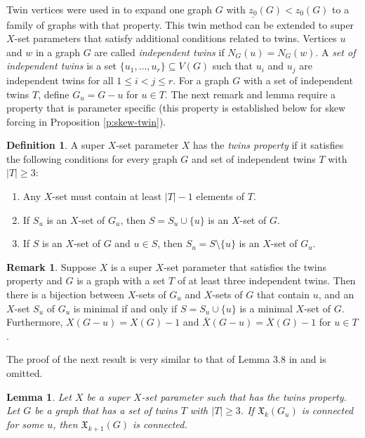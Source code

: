 \documentclass{article}
\numberwithin{figure}{section}
\numberwithin{table}{section}
\numberwithin{equation}{section}
\newtheorem{lem}[thm]{Lemma}
\theoremstyle{definition}
\newtheorem{rem}[thm]{Remark}
\theoremstyle{definition}
\newtheorem{defn}[thm]{Definition}
\theoremstyle{definition}
\newcommand{\ben}{\begin{enumerate}}
\newcommand{\een}{\end{enumerate}}
\newcommand{\ol}{\overline}
\newcommand{\Xb}{X}
\newcommand{\xbbar}{\ol X}
\newcommand{\xbtar}{\mathfrak{X}}%
\newcommand{\zzo}{z_0}
\newcommand{\ulzo}{\underline{z_0}}
\begin{document}
{ Twin vertices were used in \cite{XTARiso}  to  expand one graph $G$ with $\ulzo(G)< \zzo(G)$ to a family of graphs with that property. This twin method can be extended to super $X$-set parameters that satisfy additional conditions  related to twins. Vertices $u$ and $w$ in a graph $G$ are called \emph{independent twins} if  $N_G(u) = N_G(w)$. A \emph{set of independent twins} is a set  $\{u_1,\dots,u_r\}\subseteq V(G)$ such that $u_i$ and $u_j$ are independent twins  for all $1\le i<j\le r$. For a graph $G$ with  a set of independent twins $T$,  define $G_u = G-u$ for $u\in T$.
The next remark and lemma %
 require a  property   that is parameter specific (this property is established below for skew forcing in Proposition \ref{p:skew-twin}). 

\begin{defn} 
 A super $X$-set parameter $\Xb$ has the \emph{twins property} if it satisfies the following conditions  for every graph $G$ and  set of independent twins $T$ with $|T|\ge 3$: 
 \ben
 \item Any $\Xb$-set must contain at least $|T|-1$ elements of $T$.
 \item If $S_u$ is an $\Xb$-set of $G_u$, then $S=S_u\cup\{u\}$ is an $\Xb$-set of $G$.  
 \item If $S$ is an $\Xb$-set of $G$ and $ u\in S$, then  $S_u=S\setminus\{u\}$ is an $\Xb$-set of $G_u$.
 \een
\end{defn}

 \begin{rem}\label{r:twin} Suppose $\Xb$ is a super $X$-set parameter that satisfies the twins property and $G$ is a graph with a set $T$ of at least three independent twins.  Then there is a bijection between $\Xb$-sets of $G_u$ and $\Xb$-sets of $G$ that contain $u$, and an $\Xb$-set 
 $S_u$ of $G_u$ is minimal if and only if $S=S_u\cup\{u\}$ is a minimal $\Xb$-set of $G$.  Furthermore, $\Xb(G-u)=\Xb(G)-1$ and  $\xbbar(G-u)=\xbbar(G)-1$  for $u\in T$. 
 \end{rem}
 
 The proof of the next result is very similar to that of Lemma 3.8 in \cite{XTARiso} and is omitted.
\begin{lem}\label{l:twin-conn}
Let $\Xb$ be a super $X$-set parameter such that has the twins property. Let $G$ be a graph
that has a set of  twins $T$ with $|T|\ge 3$.  If ${\xbtar}_{k}(G_u)$ is connected for some $u$, then ${\xbtar}_{k+1}(G)$ is connected.
\end{lem}

}
\end{document}

